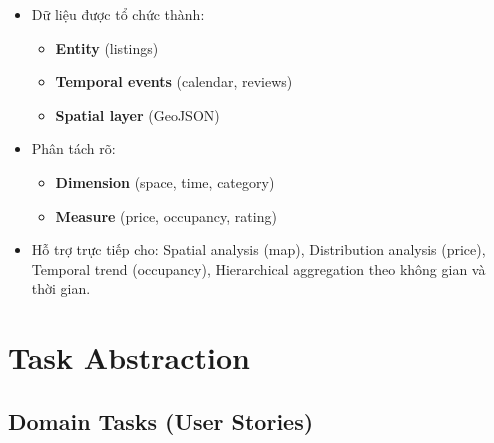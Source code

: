 \begin{itemize}
    \item Dữ liệu được tổ chức thành:
    \begin{itemize}
        \item \textbf{Entity} (listings)
        \item \textbf{Temporal events} (calendar, reviews)
        \item \textbf{Spatial layer} (GeoJSON)
    \end{itemize}
    \item Phân tách rõ:
    \begin{itemize}
        \item \textbf{Dimension} (space, time, category)
        \item \textbf{Measure} (price, occupancy, rating)
    \end{itemize}
    \item Hỗ trợ trực tiếp cho: Spatial analysis (map), Distribution analysis (price), Temporal trend (occupancy), Hierarchical aggregation theo không gian và thời gian.
\end{itemize}

\section{Task Abstraction}

\subsection{Domain Tasks (User Stories)}


